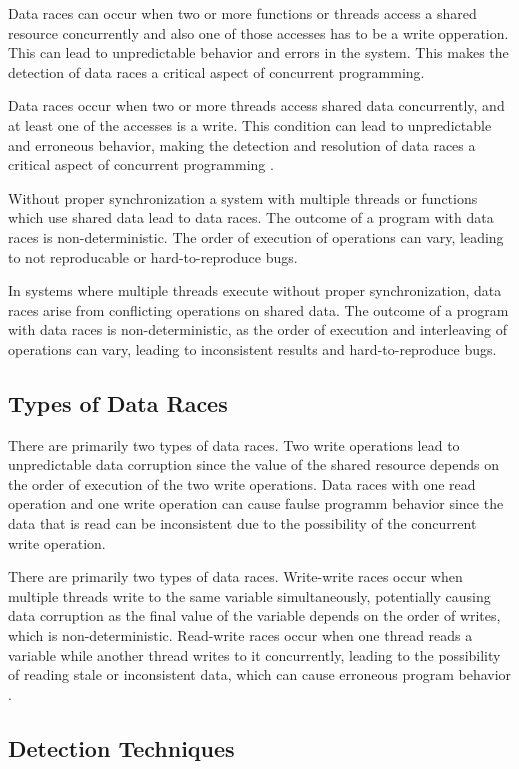 \documentclass[
fancyheadings, %
%
%
]{stsreprt}
\begin{document}
{Data races can occur when two or more functions or threads access a shared resource concurrently and also one of those accesses has to be a write opperation. This can lead to unpredictable behavior and errors in the system. This makes the detection of data races a critical aspect of concurrent programming.

Data races occur when two or more threads access shared data concurrently, and at least one of the accesses is a write. This condition can lead to unpredictable and erroneous behavior, making the detection and resolution of data races a critical aspect of concurrent programming \cite{flanagan2009}.

Without proper synchronization a system with multiple threads or functions which use shared data lead to data races. The outcome of a program with data races is non-deterministic. The order of execution of operations can vary, leading to not reproducable or hard-to-reproduce bugs. 


In systems where multiple threads execute without proper synchronization, data races arise from conflicting operations on shared data. The outcome of a program with data races is non-deterministic, as the order of execution and interleaving of operations can vary, leading to inconsistent results and hard-to-reproduce bugs.

\subsection{Types of Data Races}
There are primarily two types of data races. Two write operations lead to unpredictable data corruption since the value of the shared resource depends on the order of execution of the two write operations. Data races with one read operation and one write operation can cause faulse programm behavior since the data that is read can be inconsistent due to the possibility of the concurrent write operation.


There are primarily two types of data races. Write-write races occur when multiple threads write to the same variable simultaneously, potentially causing data corruption as the final value of the variable depends on the order of writes, which is non-deterministic. Read-write races occur when one thread reads a variable while another thread writes to it concurrently, leading to the possibility of reading stale or inconsistent data, which can cause erroneous program behavior \cite{flanagan2009}.

\subsection{Detection Techniques}

}
\end{document}
